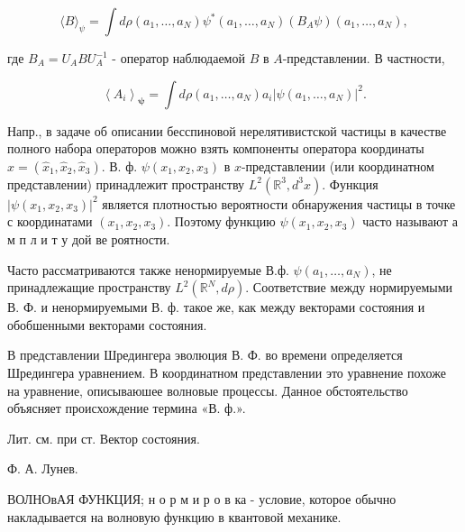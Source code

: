 \documentclass[10pt]{article}
\begin{document}
\[

\langle B\rangle_{\psi}=\int d \rho\left(a_{1}, \ldots, a_{N}\right) \psi^{*}\left(a_{1}, \ldots, a_{N}\right)\left(B_{A} \psi\right)\left(a_{1}, \ldots, a_{N}\right),

\]



где $B_{A}=U_{A} B U_{A}^{-1}$ - оператор наблюдаемой $B$ в $A$-представлении. В частности,



\[

\left\langle A_{i}\right\rangle_{\boldsymbol{\psi}}=\int d \rho\left(a_{1}, \ldots, a_{N}\right) a_{i}\left|\psi\left(a_{1}, \ldots, a_{N}\right)\right|^{2} .

\]



Напр., в задаче об описании бесспиновой нерелятивистской частицы в качестве полного набора операторов можно взять компоненты оператора координаты $\hat{x}=\left(\hat{x}_{1}, \hat{x}_{2}, \hat{x}_{3}\right)$. В. ф. $\psi\left(x_{1}, x_{2}, x_{3}\right)$ в $x$-представлении (или координатном представлении) принадлежит пространству $L^{2}\left(\mathbb{R}^{3}, d^{3} x\right)$. Функция $\left|\psi\left(x_{1}, x_{2}, x_{3}\right)\right|^{2}$ является плотностью вероятности обнаружения частицы в точке с координатами $\left(x_{1}, x_{2}, x_{3}\right)$. Поэтому функцию $\psi\left(x_{1}, x_{2}, x_{3}\right)$ часто называют а м п л и т у дой ве роятности.



Часто рассматриваются также ненормируемые В.ф. $\psi\left(a_{1}, \ldots, a_{N}\right)$, не принадлежащие пространству $L^{2}\left(\mathbb{R}^{N}, d \rho\right)$. Соответствие между нормируемыми В. Ф. и ненормируемыми В. ф. такое же, как между векторами состояния и обобшенными векторами состояния.



В представлении Шредингера эволюция В. Ф. во времени определяется Шредингера уравнением. В координатном представлении это уравнение похоже на уравнение, описываюшее волновые процессы. Данное обстоятельство объясняет происхождение термина «В. ф.».



Лит. см. при ст. Вектор состояния.



Ф. А. Лунев.



ВОЛНОвАЯ ФУНКЦИЯ; н о р м и р о в ка - условие, которое обычно накладывается на волновую функцию в квантовой механике.
\end{document}
